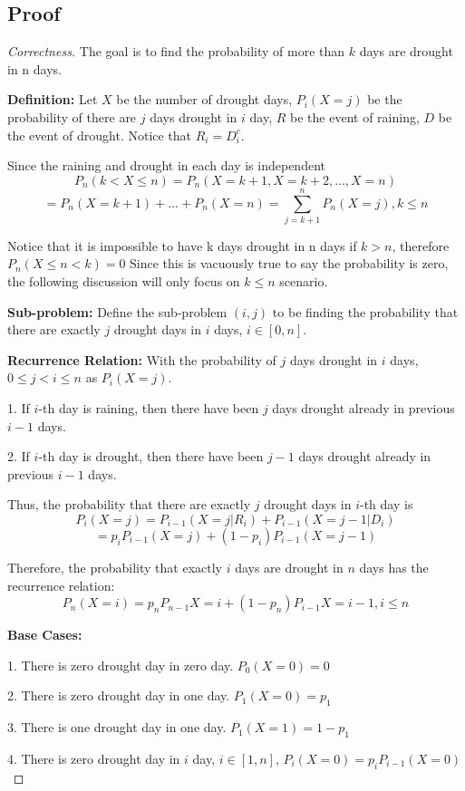 \documentclass[openany]{article}
\begin{document}
\subsection*{Proof}
\begin{proof}[Correctness]{}
The goal is to find the probability of more than $k$ days are drought in n days.

\textbf{Definition:} Let $X$ be the number of drought days, $P_i(X=j)$ be the probability of there are $j$ days drought in $i$ day, $R$ be the event of raining, $D$ be the event of drought. Notice that $R_i=D_i^c$.

Since the raining and drought in each day is independent \[P_n(k<X\leq n) = P_n(X=k+1, X=k+2, ..., X= n)\] \[= P_n(X=k+1) + ... + P_n(X=n) = \sum_{j=k+1}^{n}P_n(X=j), k \leq n\]

Notice that it is impossible to have k days drought in n days if $k>n$, therefore $P_n(X\leq n < k) = 0$ Since this is vacuously true to say the probability is zero, the following discussion will only focus on $k\leq n$ scenario.

\textbf{Sub-problem:} Define the sub-problem $(i,j)$ to be finding the probability that there are exactly $j$ drought days in $i$ days, $i\in[0,n]$.
    
\textbf{Recurrence Relation:} With the probability of $j$ days drought in $i$ days,  $0\leq j<i\leq n$ as $P_i(X=j)$.

1. If $i$-th day is raining, then there have been $j$ days drought already in previous $i-1$ days.

2. If $i$-th day is drought, then there have been $j-1$ days drought already in previous $i-1$ days.

Thus, the probability that there are exactly $j$ drought days in $i$-th day is \[P_i(X=j) = P_{i-1}(X=j|R_i) + P_{i-1}(X=j-1|D_i)\]
\[=p_i P_{i-1}(X=j) + (1-p_i)P_{i-1}(X=j-1)\]

Therefore, the probability that exactly $i$ days are drought in $n$ days has the recurrence relation:
\[P_n(X=i) = p_n P_{n-1}{X=i} + (1-p_n)P_{i-1}{X=i-1}, i\leq n\]
    
    
\textbf{Base Cases:}

1. There is zero drought day in zero day. $P_0(X=0)=0$

2. There is zero drought day in one day. $P_1(X=0)=p_1$

3. There is one drought day in one day. $P_1(X=1)=1-p_1$

4. There is zero drought day in $i$ day, $i\in[1,n]$, $P_i(X=0)=p_i P_{i-1}(X=0)$


\end{proof}
\end{document}
